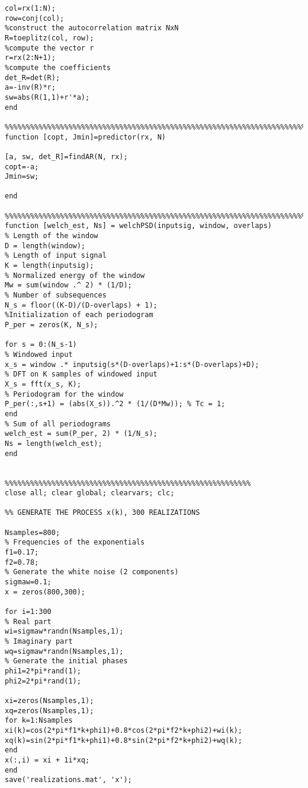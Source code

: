 \documentclass[a4paper,10pt]{article}
\begin{document}
\begin{verbatim}
col=rx(1:N);
row=conj(col);
%construct the autocorrelation matrix NxN
R=toeplitz(col, row);
%compute the vector r
r=rx(2:N+1);
%compute the coefficients
det_R=det(R);
a=-inv(R)*r;
sw=abs(R(1,1)+r'*a);
end

%%%%%%%%%%%%%%%%%%%%%%%%%%%%%%%%%%%%%%%%%%%%%%%%%%%%%%%%%%%%%%%%%%%%%%%
function [copt, Jmin]=predictor(rx, N)

[a, sw, det_R]=findAR(N, rx);
copt=-a;
Jmin=sw;

end

%%%%%%%%%%%%%%%%%%%%%%%%%%%%%%%%%%%%%%%%%%%%%%%%%%%%%%%%%%%%%%%%%%%%%%%
function [welch_est, Ns] = welchPSD(inputsig, window, overlaps)
% Length of the window
D = length(window);
% Length of input signal
K = length(inputsig);
% Normalized energy of the window
Mw = sum(window .^ 2) * (1/D);
% Number of subsequences
N_s = floor((K-D)/(D-overlaps) + 1);
%Initialization of each periodogram
P_per = zeros(K, N_s);

for s = 0:(N_s-1)
% Windowed input
x_s = window .* inputsig(s*(D-overlaps)+1:s*(D-overlaps)+D);
% DFT on K samples of windowed input
X_s = fft(x_s, K);
% Periodogram for the window
P_per(:,s+1) = (abs(X_s)).^2 * (1/(D*Mw)); % Tc = 1;
end
% Sum of all periodograms
welch_est = sum(P_per, 2) * (1/N_s);
Ns = length(welch_est);
end


%%%%%%%%%%%%%%%%%%%%%%%%%%%%%%%%%%%%%%%%%%%%%%%%%%%%%%%%%%
close all; clear global; clearvars; clc;

%% GENERATE THE PROCESS x(k), 300 REALIZATIONS

Nsamples=800;
% Frequencies of the exponentials
f1=0.17;
f2=0.78;
% Generate the white noise (2 components)
sigmaw=0.1;
x = zeros(800,300);

for i=1:300
% Real part
wi=sigmaw*randn(Nsamples,1);
% Imaginary part
wq=sigmaw*randn(Nsamples,1);
% Generate the initial phases
phi1=2*pi*rand(1);
phi2=2*pi*rand(1);

xi=zeros(Nsamples,1);
xq=zeros(Nsamples,1);
for k=1:Nsamples
xi(k)=cos(2*pi*f1*k+phi1)+0.8*cos(2*pi*f2*k+phi2)+wi(k);
xq(k)=sin(2*pi*f1*k+phi1)+0.8*sin(2*pi*f2*k+phi2)+wq(k);
end
x(:,i) = xi + 1i*xq;
end
save('realizations.mat', 'x');
\end{verbatim}
\end{document}
